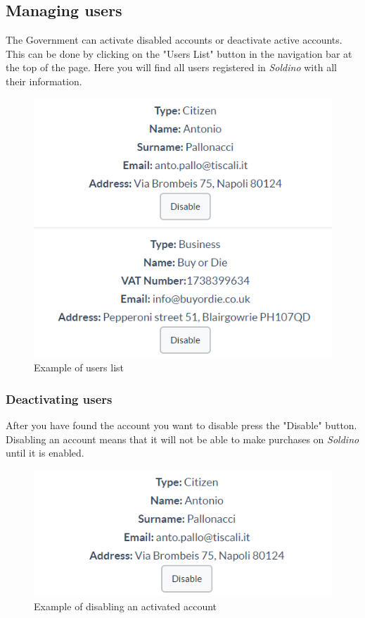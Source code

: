 	\subsection{Managing users}
	The Government can activate disabled accounts or deactivate active accounts.
	This can be done by clicking on the "Users List" button in the navigation
	bar at the top of the page. Here you will find all users registered in 
	\textit{Soldino} with all their information.
	\begin{figure}[H]
		\includegraphics[width=15cm]{res/images/users_list.png}
		\centering
		\caption{Example of users list}
	\end{figure}
		\subsubsection{Deactivating users}
		After you have found the account you want to disable press the 
		"Disable" button. Disabling an account 
		means that it will not be able to make purchases on \textit{Soldino} 
		until it is enabled.
		\begin{figure}[H]
			\includegraphics[width=13cm]{res/images/users_disable.png}
			\centering
			\caption{Example of disabling an activated account}
		\end{figure}

